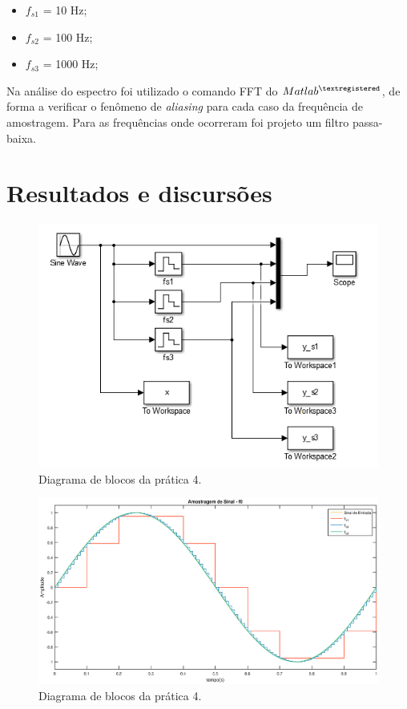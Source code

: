 \begin{itemize}
	\item $f_{s1}$ = 10 Hz;
	\item $f_{s2}$ = 100 Hz;
	\item $f_{s3}$ = 1000 Hz; 
\end{itemize}

Na análise do espectro foi utilizado o comando FFT do $Matlab^{\textregistered}$, de forma a verificar o fenômeno de \textit{aliasing}	 para cada caso da frequência de amostragem. Para as frequências onde ocorreram  foi projeto um filtro passa-baixa.


\section{Resultados e discursões}

\begin{figure}[!th]
	\centering
	\includegraphics[scale = .55]{Imagens/pratica4_1.PNG}
	\caption{Diagrama de blocos da prática 4.}
	\label{fig:pr4_esquema}
\end{figure}

\begin{figure}[!th]
	\centering
	\includegraphics[scale = .45]{Imagens/pratica4_2.eps}
	\caption{Diagrama de blocos da prática 4.}
	\label{fig:pr4_esquema}
\end{figure}

